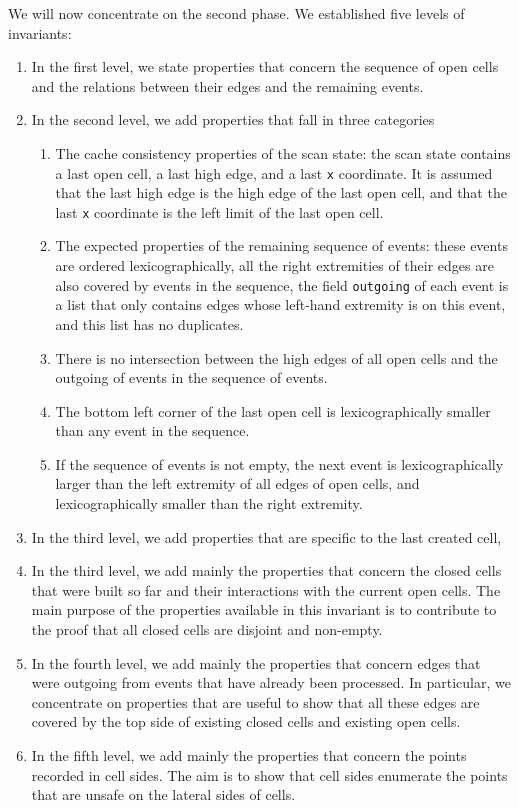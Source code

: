 \documentclass[a4paper, USenglish, cleveref, autoref, thm-restate, final]{lipics-v2021}
\begin{document}
We will now concentrate on the second phase.
We established five levels of invariants:
\begin{enumerate}
\item In the first level, we state properties that concern the
sequence of open cells and the relations between their edges and the remaining
events.
\item In the second level, we add properties that fall in three categories
  \begin{enumerate}
    \item The cache consistency properties of
  the scan state: the scan state contains a last open cell, a last high edge,
  and a last {\tt x} coordinate.  It is assumed that the last high edge
  is the high edge of the last open cell, and that the last {\tt x} coordinate
  is the left limit of the last open cell.
\item The expected properties of the remaining sequence of events: these
  events are ordered lexicographically, all the right extremities of their
  edges are also covered by events in the sequence, the field {\tt outgoing}
  of each event is a list that only contains edges whose left-hand extremity
  is on this event, and this list has no duplicates.
\item There is no intersection between the high edges of all open cells
  and the outgoing of events in the sequence of events.
\item The bottom left corner of the last open cell is lexicographically
  smaller than any event in the sequence.
\item If the sequence of events is not empty, the next event is
  lexicographically larger than the left extremity of all edges of
  open cells, and lexicographically smaller than the right extremity.
\end{enumerate}
\item In the third level, we add properties that are specific to the
  last created cell,
\item In the third level, we add mainly the properties that concern
  the closed cells that were built so far and their interactions with
  the current open cells.  The main purpose of the properties
  available in this invariant is to contribute to the proof that
  all closed cells are disjoint and non-empty.
\item In the fourth level, we add mainly the properties that concern
  edges that were outgoing from events that have already been processed.
  In particular, we concentrate on properties that are useful to show that
  all these edges are covered by the top side of existing closed cells and
  existing open cells.
\item In the fifth level, we add mainly the properties that concern
  the points recorded in cell sides.  The aim is to show that cell
  sides enumerate the points that are unsafe on the lateral
  sides of cells.
\end{enumerate}
\end{document}
